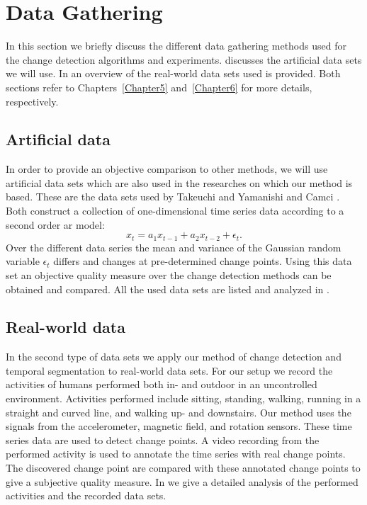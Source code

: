 \section{Data Gathering}\label{sec:method_data_gathering}
In this section we briefly discuss the different data gathering methods used for the change detection algorithms and experiments.
 discusses the artificial data sets we will use.
In  an overview of the real-world data sets used is provided.
Both sections refer to Chapters~\ref{Chapter5} and~\ref{Chapter6} for more details, respectively.

\subsection{Artificial data}\label{subsec:data_gathering_artificial}
In order to provide an objective comparison to other methods, we will use artificial data sets which are also used in the researches on which our method is based.
These are the data sets used by Takeuchi and Yamanishi \cite{takeuchi2006unifying} and Camci \cite{camci2010change}.
Both construct a collection of one-dimensional time series data according to a second order \gls{ar} model:
\begin{equation}
  x_t = a_1 x_{t-1} + a_2 x_{t-2} + \epsilon_t.
\end{equation}
Over the different data series the mean and variance of the Gaussian random variable $\epsilon_t$ differs and changes at pre-determined change points.
Using this data set an objective quality measure over the change detection methods can be obtained and compared.
All the used data sets are listed and analyzed in .

\subsection{Real-world data}\label{subsec:data_gathering_real_world}
In the second type of data sets we apply our method of change detection and temporal segmentation to real-world data sets.
For our setup we record the activities of humans performed both in- and outdoor in an uncontrolled environment.
Activities performed include sitting, standing, walking, running in a straight and curved line, and walking up- and downstairs.
Our method uses the signals from the accelerometer, magnetic field, and rotation sensors.
These time series data are used to detect change points.
A video recording from the performed activity is used to annotate the time series with real change points.
The discovered change point are compared with these annotated change points to give a subjective quality measure.
In  we give a detailed analysis of the performed activities and the recorded data sets.

